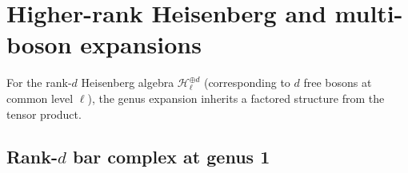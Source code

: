 \section{Higher-rank Heisenberg and multi-boson expansions}
\label{sec:higher-rank-heisenberg-eisenstein}

For the rank-$d$ Heisenberg algebra $\mathcal{H}_\ell^{\oplus d}$
(corresponding to $d$ free bosons at common level $\ell$), the genus
expansion inherits a factored structure from the tensor product.

\subsection{\texorpdfstring{Rank-$d$ bar complex at genus 1}{Rank-d bar complex at genus 1}}

